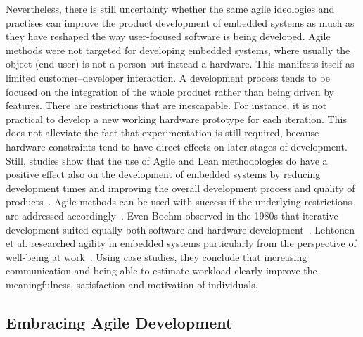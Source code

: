 \documentclass[english]{tktltiki2}
\begin{document}
Nevertheless, there is still uncertainty whether the same agile ideologies and practises can improve the product development of embedded systems as much as they have reshaped the way user-focused software is being developed. Agile methods were not targeted for developing embedded systems, where usually the object (end-user) is not a person but instead a hardware. This manifests itself as limited customer–developer interaction. A development process tends to be focused on the integration of the whole product rather than being driven by features. There are restrictions that are inescapable. For instance, it is not practical to develop a new working hardware prototype for each iteration. This does not alleviate the fact that experimentation is still required, because hardware constraints tend to have direct effects on later stages of development. Still, studies show that the use of Agile and Lean methodologies do have a positive effect also on the development of embedded systems by reducing development times and improving the overall development process and quality of products~\cite{CWR10, KRM13}. Agile methods can be used with success if the underlying restrictions are addressed accordingly~\cite{RA03}. Even Boehm observed in the 1980s that iterative development suited equally both software and hardware development~\cite{Boe88}. Lehtonen et al. researched agility in embedded systems particularly from the perspective of well-being at work~\cite{LTR14}. Using case studies, they conclude that increasing communication and being able to estimate workload clearly improve the meaningfulness, satisfaction and motivation of individuals.

\subsection{Embracing Agile Development}
\end{document}
